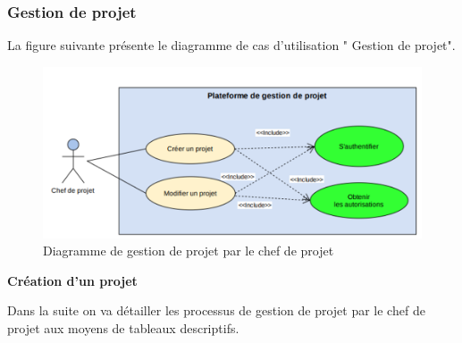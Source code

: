 \subsubsection{	Gestion de projet}
\par La figure suivante présente le diagramme de cas d’utilisation " Gestion de projet".
\begin{figure}[h]
    \centering
    \includegraphics[scale=1]{figures/anis12.png}
    \caption{Diagramme de gestion de projet par le chef de projet}
    \label{fig:cas_gestp_chefp}
\end{figure}
\newpage
\par \textbf{ 	Création d’un projet}
\par Dans la suite on va détailler les processus de gestion de projet par le chef de projet aux moyens de tableaux descriptifs.
